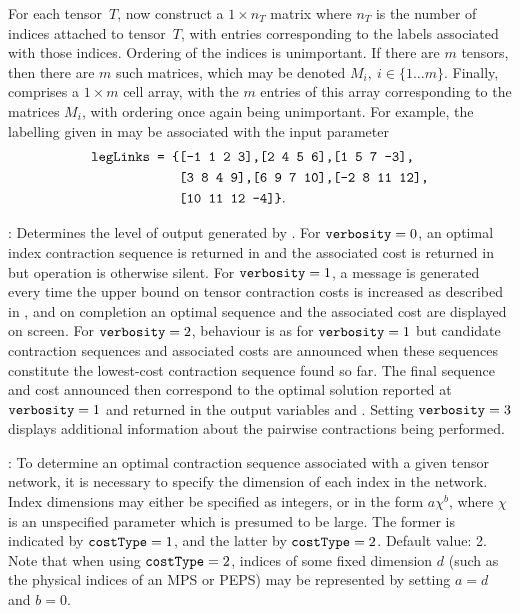 For each tensor~$T$, now construct a $1\times n_T$ matrix where $n_T$ is the number of indices attached to tensor~$T$, with entries corresponding to the labels associated with those indices. Ordering of the indices is unimportant. If there are $m$ tensors, then there are $m$ such matrices, which may be denoted $M_i,~i\in\{1\ldots m\}$.
Finally,  comprises a $1\times m$ cell array, with the $m$ entries of this array corresponding to the matrices $M_i$, with ordering once again being unimportant. For example, the labelling given in  may be associated with the input parameter
\begin{align*}
\texttt{legLinks~=~\{}&\texttt{[-1 1 2 3],[2 4 5 6],[1 5 7 -3],}\\
&\texttt{[3 8 4 9],[6 9 7 10],[-2 8 11 12],}\\
&\texttt{[10 11 12 -4]\}}.
\end{align*}

: Determines the level of output generated by . For $\texttt{verbosity}=0$, an optimal index contraction sequence is returned in  and the associated cost is returned in  but operation is otherwise silent. For $\texttt{verbosity}=1$, a message is generated every time the upper bound on tensor contraction costs is increased as described in , and on completion an optimal sequence and the associated cost are displayed on screen. For $\texttt{verbosity}=2$, behaviour is as for $\texttt{verbosity}=1$ but candidate contraction sequences and associated costs are announced when these sequences constitute the lowest-cost contraction sequence found so far. The final sequence and cost announced then correspond to the optimal solution reported at $\texttt{verbosity}=1$ and returned in the output variables  and . Setting $\texttt{verbosity}=3$ displays additional information about the pairwise contractions being performed. %

: To determine an optimal contraction sequence associated with a given tensor network, it is necessary to specify the dimension of each index in the network. Index dimensions may either be specified as integers, or in the form $a\chi^b$, where $\chi$ is an unspecified parameter which is presumed to be large. The former is indicated by $\texttt{costType}=1$, and the latter by $\texttt{costType}=2$. Default value: 2. Note that
when using $\texttt{costType}=2$, indices of some fixed dimension $d$ (such as the physical indices of an MPS or PEPS) may be represented by setting $a=d$ and $b=0$.


